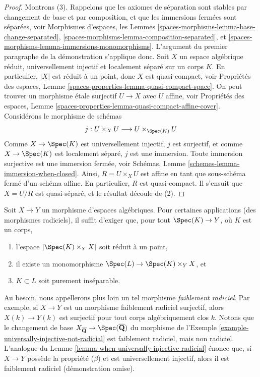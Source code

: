 \begin{proof}
\medskip\noindent
Montrons (3).
Rappelons que les axiomes de séparation sont stables par changement de base
et par composition, et que les immersions fermées sont séparées, voir
Morphismes d'espaces,
les Lemmes \ref{spaces-morphisms-lemma-base-change-separated},
\ref{spaces-morphisms-lemma-composition-separated}, et
\ref{spaces-morphisms-lemma-immersions-monomorphisms}.
L'argument du premier paragraphe de la démonstration s'applique donc.
Soit $X$ un espace algébrique réduit, universellement injectif et
localement séparé sur un corps $K$.
En particulier, $|X|$ est réduit à un point, donc $X$ est quasi-compact, voir
Propriétés des espaces, Lemme \ref{spaces-properties-lemma-quasi-compact-space}.
On peut trouver un morphisme étale surjectif $U \to X$ avec $U$ affine, voir
Propriétés des espaces,
Lemme \ref{spaces-properties-lemma-quasi-compact-affine-cover}.
Considérons le morphisme de schémas
$$
j :
U \times_X U
\longrightarrow
U \times_{\Spec(K)} U
$$
Comme $X \to \Spec(K)$ est universellement injectif, $j$ est surjectif,
et comme $X \to \Spec(K)$ est localement séparé, $j$ est une immersion.
Toute immersion surjective est une immersion fermée, voir
Schémas, Lemme \ref{schemes-lemma-immersion-when-closed}.
Ainsi, $R = U \times_X U$ est affine en tant que sous-schéma fermé d'un schéma affine.
En particulier, $R$ est quasi-compact.
Il s'ensuit que $X = U/R$ est quasi-séparé, et le résultat découle de (2).
\end{proof}

\begin{remark}
\label{remark-weakly-radicial}
Soit $X \to Y$ un morphisme d'espaces algébriques.
Pour certaines applications (des morphismes radiciels),
il suffit d'exiger que, pour tout
$\Spec(K) \to Y$, où $K$ est un corps,
\begin{enumerate}
\item l'espace $|\Spec(K) \times_Y X|$ soit réduit à un point,
\item il existe un monomorphisme
$\Spec(L) \to \Spec(K) \times_Y X$, et
\item $K \subset L$ soit purement inséparable.
\end{enumerate}
Au besoin, nous appellerons plus loin un tel morphisme {\it faiblement radiciel}.
Par exemple, si $X \to Y$ est un morphisme faiblement radiciel surjectif,
alors $X(k) \to Y(k)$ est surjectif pour tout corps algébriquement clos $k$.
Notons que le changement de base
$X_{\overline{\mathbf{Q}}} \to \Spec(\overline{\mathbf{Q}})$
du morphisme de
l'Exemple \ref{example-universally-injective-not-radicial}
est faiblement radiciel, mais non radiciel. L'analogue du
Lemme \ref{lemma-when-universally-injective-radicial}
énonce que, si $X \to Y$ possède la propriété ($\beta$) et est universellement
injectif, alors il est faiblement radiciel (démonstration omise).
\end{remark}

